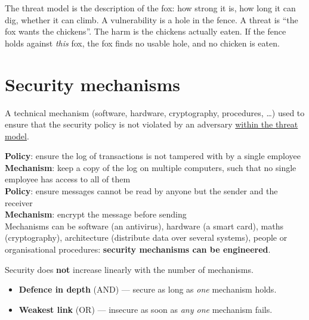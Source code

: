\begin{goatbox}
The threat model is the description of the fox: how strong it is, how long it can dig, whether
it can climb. A vulnerability is a hole in the fence. A threat is ``the fox wants the chickens''.
The harm is the chickens actually eaten. If the fence holds against \emph{this} fox, the fox finds
no usable hole, and no chicken is eaten.
\end{goatbox}

\section{Security mechanisms}

\begin{defnbox}[title=Security mechanism]
A technical mechanism (software, hardware, cryptography, procedures, \ldots) used to
ensure that the security policy is not violated by an adversary
\underline{within the threat model}.
\end{defnbox}

\begin{exbox}[title=Examples]
\textbf{Policy}: ensure the log of transactions is not tampered with by a single employee \\
\textbf{Mechanism}: keep a copy of the log on multiple computers, such that no single employee
has access to all of them \\[3pt]
\textbf{Policy}: ensure messages cannot be read by anyone but the sender and the receiver \\
\textbf{Mechanism}: encrypt the message before sending \\[3pt]
Mechanisms can be software (an antivirus), hardware (a smart card), maths (cryptography),
architecture (distribute data over several systems), people or organisational procedures:
\textbf{security mechanisms can be engineered}.
\end{exbox}

\begin{propbox}[title=Composing mechanisms]
Security does \textbf{not} increase linearly with the number of mechanisms.
\begin{itemize}
  \item \textbf{Defence in depth} (AND) — secure as long as \emph{one} mechanism holds.
  \item \textbf{Weakest link} (OR) — insecure as soon as \emph{any one} mechanism fails.
\end{itemize}
\end{propbox}

